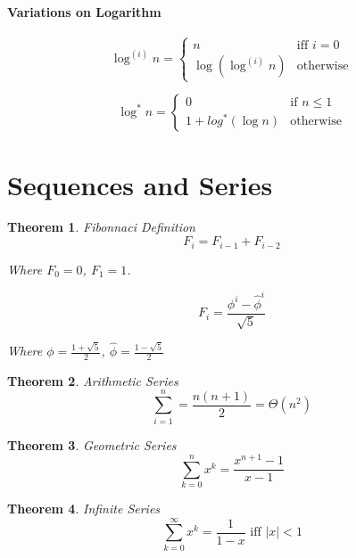 \documentclass[a4paper,12pt]{report}
\newtheorem{theorem}{Theorem}
\begin{document}
\paragraph{Variations on Logarithm} 

\begin{equation}
\log^{(i)} n = \begin{cases}
n & \text{iff } i = 0 \\
\log(\log^{(i)} n) & \text{otherwise}
\end{cases}
\end{equation}

\begin{equation}
\log^* n = \begin{cases}
0 & \text{if } n \leq 1 \\
1 + log^*(\log n) & \text{otherwise}
\end{cases}
\end{equation}


\section{Sequences and Series}

\begin{theorem}{Fibonnaci Definition}
\begin{equation}
F_i = F_{i-1} + F_{i-2}
\end{equation}

Where $F_0 = 0$, $F_1 = 1$.

\begin{equation}
F_i = \frac{\phi^i - \hat \phi^i}{\sqrt{5}}
\end{equation}

Where $\phi = \frac{1+\sqrt{5}}{2}$, $\hat \phi = \frac{1-\sqrt 5}{2}$
\end{theorem}


\begin{theorem}{Arithmetic Series}
\begin{equation}
\sum_{i=1}^{n} = \frac{n(n+1)}{2} = \Theta(n^2)
\end{equation}
\end{theorem}


\begin{theorem}{Geometric Series}
\begin{equation}
\sum_{k=0}^{n} x^k = \frac{x^{n+1}-1}{x-1} 
\end{equation}
\end{theorem}


\begin{theorem}{Infinite Series}
\begin{equation}
\sum_{k=0}^{\infty} x^k = \frac{1}{1-x} \text{ iff } |x| < 1
\end{equation}
\end{theorem}
\end{document}
